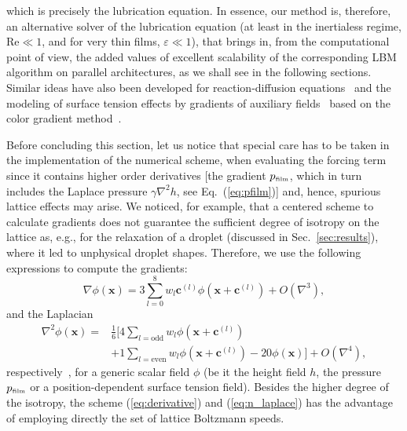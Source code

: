 which is precisely the lubrication equation.
In essence, our method is, therefore, an alternative solver of the lubrication equation (at least in the inertialess regime, $\text{Re} \ll 1$, and for very thin films, $\varepsilon \ll 1$), that brings in, from the computational point of view, the added values of excellent scalability of the corresponding LBM algorithm on parallel architectures, as we shall see in the following sections. 
Similar ideas have also been developed for reaction-diffusion equations~\cite{caliDiffusionHydrodynamicDispersion1992,kingdonReactionflowLatticeBoltzmann1992,chenLatticeMethodsTheir1995,weimarNonlinearReactionsAdvected1996} and the modeling of surface tension effects by gradients of auxiliary fields~\cite{swiftLatticeBoltzmannSimulations1996, lishchukLatticeBoltzmannAlgorithm2003} based on the color gradient method~\cite{gunstensenLatticeBoltzmannModel1991}.

Before concluding this section, let us notice that special care has to be taken in the implementation of the numerical scheme, when evaluating the forcing term since it contains higher order derivatives [the gradient $p_{\mbox{\tiny{film}}}$, which in turn includes the Laplace pressure $\gamma \nabla^2 h$, see Eq.~(\ref{eq:pfilm})] and, hence, spurious lattice effects may arise.  
We noticed, for example, that a centered scheme to calculate gradients \cite{zhouLatticeBoltzmannMethods2004} does not guarantee the sufficient degree of isotropy on the lattice as, e.g., for the relaxation of a droplet (discussed in Sec.~\ref{sec:results}), where it led to unphysical droplet shapes.
Therefore, we use the following expressions to compute the gradients:
\begin{equation}\label{eq:derivative}
    \nabla \phi(\mathbf{x}) = 3\sum_{l=0}^8w_l\mathbf{c}^{(l)} \phi(\mathbf{x}+\mathbf{c}^{(l)})+O(\nabla^3),
\end{equation}
and the Laplacian 
\begin{align}\label{eq:n_laplace}
    \nabla^2 \phi(\mathbf{x}) =& \frac{1}{6}\bigg[4\sum_{l = \text{odd}} w_l \phi(\mathbf{x}+\mathbf{c}^{(l)})\nonumber\\ 
    &+ 1\sum_{l = \text{even}} w_l \phi(\mathbf{x}+\mathbf{c}^{(l)}) - 20\phi(\mathbf{x}) \bigg] + O(\nabla^4),
\end{align}
respectively~\cite{junkDiscretizationsIncompressibleNavier2000,thampiIsotropicDiscreteLaplacian2013}, for a generic scalar field $\phi$ (be it the height field $h$, the pressure $p_{\mbox{\tiny{film}}}$ or a position-dependent surface tension field).
Besides the higher degree of the isotropy, the scheme (\ref{eq:derivative}) and (\ref{eq:n_laplace}) has the advantage of employing directly the set of lattice Boltzmann speeds. 

